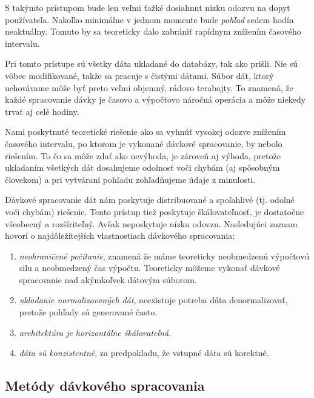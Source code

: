 S takýmto prístupom bude len veľmi ťažké dosiahnut nízku odozvu na dopyt používateľa. Nakoľko minimálne v jednom momente bude \textit{pohľad} sedem hodín neaktuálny. Tomuto by sa teoreticky dalo zabrániť rapídnym znížením časového intervalu.
\par
Pri tomto prístupe sú všetky dáta ukladané do databázy, tak ako prišli. Nie sú vôbec modifikované, takže sa pracuje s čistými dátami. Súbor dát, ktorý uchovávame môže byť preto veľmi objemný, rádovo terabajty. To znamená, že každé spracovanie dávky je časovo a výpočtovo náročná operácia a môže niekedy trvať aj celé hodiny. 
\par 
Nami poskytnuté teoretické riešenie ako sa vyhnúť vysokej odozve znížením časového intervalu, po ktorom je vykonané dávkové spracovanie, by nebolo riešením.
To čo sa môže zdať ako nevýhoda, je zároveň aj výhoda, pretože ukladaním všetkých dát dosahujeme odolnosť voči chybám (aj spôsobným človekom) a pri vytváraní pohľadu zohľadňujeme údaje z minulosti. 
\par
Dávkové spracovanie dát nám poskytuje distribuované a spoľahlivé (tj. odolné voči chybám) riešenie. Tento prístup tiež poskytuje škálovateľnosť, je dostatočne všeobecný a rozšíriteľný. Avšak neposkytuje nízku odovzu. Nasledujúci zoznam hovorí o najdôležitejších vlastnostiach dávkového spracovania:
\begin{enumerate}
    \item \textit{neohraničené počítanie}, znamená že máme teoreticky neobmedzenú výpočtovú silu a neobmedzený čas výpočtu. Teoreticky môžeme vykonať dávkové spracovanie nad akýmkoľvek dátovým súborom.
    \item \textit{ukladanie normalizovaných dát}, neexistuje potreba dáta denormalizovať, pretože pohľady sú generované často.
    \item \textit{architektúra je horizontálne škálovateľná}.
    \item \textit{dáta sú konzistentné}, za predpokladu, že vstupné dáta sú korektné.
\end{enumerate}

\subsection{Metódy dávkového spracovania}
